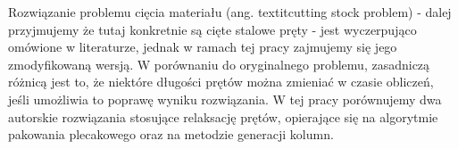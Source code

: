 Rozwiązanie problemu cięcia materiału (ang. textit{cutting stock problem}) - dalej przyjmujemy że tutaj konkretnie są cięte stalowe pręty - jest wyczerpująco omówione w literaturze, jednak w ramach tej pracy zajmujemy się jego zmodyfikowaną wersją. W porównaniu do oryginalnego problemu, zasadniczą różnicą jest to, że niektóre długości prętów można zmieniać w czasie obliczeń, jeśli umożliwia to poprawę wyniku rozwiązania. W tej pracy porównujemy dwa autorskie rozwiązania stosujące relaksację prętów, opierające się na algorytmie pakowania plecakowego oraz na metodzie generacji kolumn.